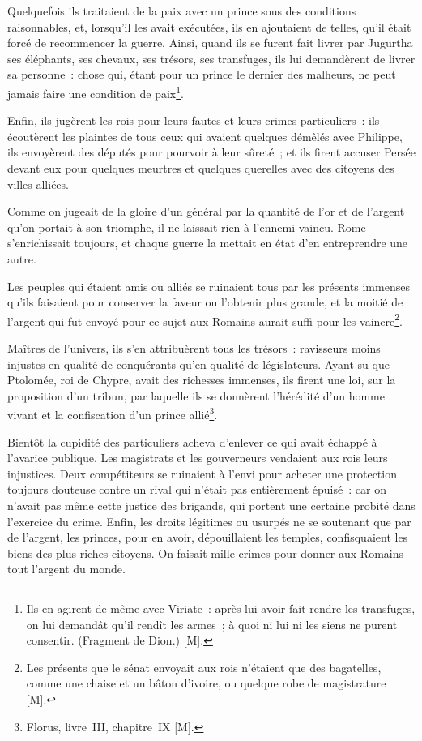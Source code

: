 \documentclass[french,twoside]{book} %
\begin{document}
Quelquefois ils traitaient de la paix avec un prince sous des conditions raisonnables, et, lorsqu’il les avait exécutées, ils en ajoutaient de telles, qu’il était forcé de recommencer la guerre. Ainsi, quand ils se furent fait livrer par Jugurtha ses éléphants, ses chevaux, ses trésors, ses transfuges, ils lui demandèrent de livrer sa personne : chose qui, étant pour un prince le dernier des malheurs, ne peut jamais faire une condition de paix\footnote{Ils en agirent de même avec Viriate : après lui avoir fait rendre les transfuges, on lui demandât qu’il rendît les armes ; à quoi ni lui ni les siens ne purent consentir. (Fragment de Dion.) [M].}.\par
Enfin, ils jugèrent les rois pour leurs fautes et leurs crimes particuliers : ils écoutèrent les plaintes de tous ceux qui avaient quelques démêlés avec Philippe, ils envoyèrent des députés pour pourvoir à leur sûreté ; et ils firent accuser Persée devant eux pour quelques meurtres et quelques querelles avec des citoyens des villes alliées.\par
Comme on jugeait de la gloire d’un général par la quantité de l’or et de l’argent qu’on portait à son triomphe, il ne laissait rien à l’ennemi vaincu. Rome s’enrichissait toujours, et chaque guerre la mettait en état d’en entreprendre une autre.\par
Les peuples qui étaient amis ou alliés se ruinaient tous par les présents immenses qu’ils faisaient pour conserver la faveur ou l’obtenir plus grande, et la moitié de l’argent qui fut envoyé pour ce sujet aux Romains aurait suffi pour les vaincre\footnote{Les présents que le sénat envoyait aux rois n’étaient que des bagatelles, comme une chaise et un bâton d’ivoire, ou quelque robe de magistrature [M].}.\par
Maîtres de l’univers, ils s’en attribuèrent tous les trésors : ravisseurs moins injustes en qualité de conquérants qu’en qualité de législateurs. Ayant su que Ptolomée, roi de Chypre, avait des richesses immenses, ils firent une loi, sur la proposition d’un tribun, par laquelle ils se donnèrent l’hérédité d’un homme vivant et la confiscation d’un prince allié\footnote{Florus, livre III, chapitre IX [M].}.\par
Bientôt la cupidité des particuliers acheva d’enlever ce qui avait échappé à l’avarice publique. Les magistrats et les gouverneurs vendaient aux rois leurs injustices. Deux compétiteurs se ruinaient à l’envi pour acheter une protection toujours douteuse contre un rival qui n’était pas entièrement épuisé : car on n’avait pas même cette justice des brigands, qui portent une certaine probité dans l’exercice du crime. Enfin, les droits légitimes ou usurpés ne se soutenant que par de l’argent, les princes, pour en avoir, dépouillaient les temples, confisquaient les biens des plus riches citoyens. On faisait mille crimes pour donner aux Romains tout l’argent du monde.\par
\end{document}
